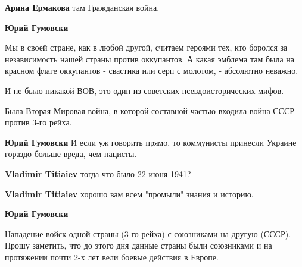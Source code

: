 \begin{itemize}

\textbf{Арина Ермакова} там Гражданская война.


\textbf{Юрий Гумовски} 

Мы в своей стране, как в любой другой, считаем героями тех, кто боролся за
независимость нашей страны против оккупантов. А какая эмблема там была на
красном флаге оккупантов - свастика или серп с молотом, - абсолютно неважно. 

И не было никакой ВОВ, это один из советских псевдоисторических мифов. 

Была Вторая Мировая война, в которой составной частью входила война СССР против
3-го рейха.


\textbf{Юрий Гумовски} И если уж говорить прямо, то коммунисты принесли Украине гораздо больше вреда, чем нацисты.


\textbf{Vladimir Titiaiev} тогда что было 22 июня 1941?


\textbf{Vladimir Titiaiev} хорошо вам всем "промыли" знания и историю.


\textbf{Юрий Гумовски} 

Нападение войск одной страны (3-го рейха) с союзниками на другую (СССР). Прошу
заметить, что до этого дня данные страны были союзниками и на протяжении почти
2-х лет вели боевые действия в Европе.





\end{itemize}
